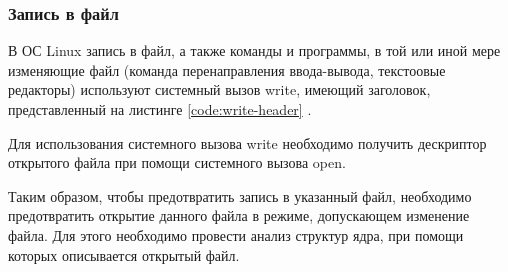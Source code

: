 %
%
%

\subsubsection{Запись в файл}

В ОС Linux запись в файл, а также команды и программы, в той или иной мере изменяющие файл (команда перенаправления ввода-вывода, текстоовые редакторы) используют системный вызов write, имеющий	 заголовок, представленный на листинге \ref{code:write-header} \cite{write-manual}.

Для использования системного вызова write необходимо получить дескриптор открытого файла при помощи системного вызова open.

Таким образом, чтобы предотвратить запись в указанный файл, необходимо предотвратить открытие данного файла в режиме, допускающем изменение файла. Для этого необходимо провести анализ структур ядра, при помощи которых описывается открытый файл.

